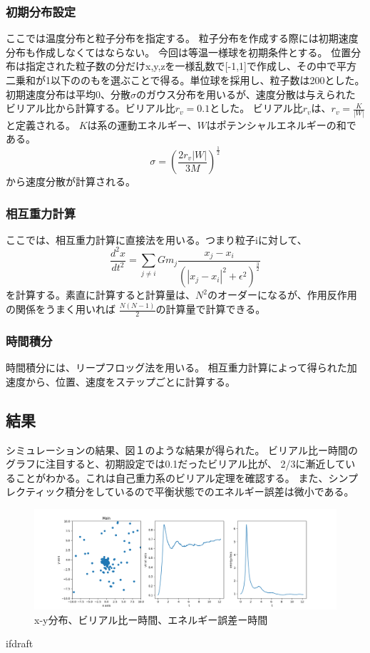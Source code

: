 \documentclass{jsarticle}
\begin{document}
\subsubsection{初期分布設定} 
ここでは温度分布と粒子分布を指定する。
粒子分布を作成する際には初期速度分布も作成しなくてはならない。
今回は等温一様球を初期条件とする。
位置分布は指定された粒子数の分だけx,y,zを一様乱数で[-1,1]で作成し、その中で平方二乗和が1以下ののもを選ぶことで得る。単位球を採用し、粒子数は200とした。
初期速度分布は平均0、分散$\sigma$のガウス分布を用いるが、速度分散は与えられたビリアル比から計算する。ビリアル比$r_v=0.1$とした。
ビリアル比$r_v$は、$r_v = \frac{K}{|W|}$と定義される。
$K$は系の運動エネルギー、$W$はポテンシャルエネルギーの和である。
\begin{equation}
    \sigma = (\frac{2r_v|W|}{3M})^{\frac{1}{2}}
\end{equation}
から速度分散が計算される。
\subsubsection{相互重力計算}
ここでは、相互重力計算に直接法を用いる。つまり粒子iに対して、
\begin {equation}
    \frac{d^2x}{dt^2} = \sum_{j \neq i} G m_j \frac{x_j - x_i}{(|x_j - x_i|^2 + \epsilon^2)^\frac{3}{2}}
\end{equation}
を計算する。素直に計算すると計算量は、$N^2$のオーダーになるが、作用反作用の関係をうまく用いれば
$\frac{N(N-1)}{2}$の計算量で計算できる。

\subsubsection{時間積分}
時間積分には、リープフロッグ法を用いる。
相互重力計算によって得られた加速度から、位置、速度をステップごとに計算する。
\subsection {結果}
シミュレーションの結果、図１のような結果が得られた。
ビリアル比ー時間のグラフに注目すると、初期設定では0.1だったビリアル比が、
2/3に漸近していることがわかる。これは自己重力系のビリアル定理を確認する。
また、シンプレクティック積分をしているので平衡状態でのエネルギー誤差は微小である。
\begin{figure}[b]
    \label{fig:result}
    \includegraphics[width=\textwidth,natwidth=1000,natheight=642]{fig.png}
    \caption{x-y分布、ビリアル比ー時間、エネルギー誤差ー時間}
\end{figure}
\expandafter\ifx\csname ifdraft\endcsname\relax
  
\end{document}
